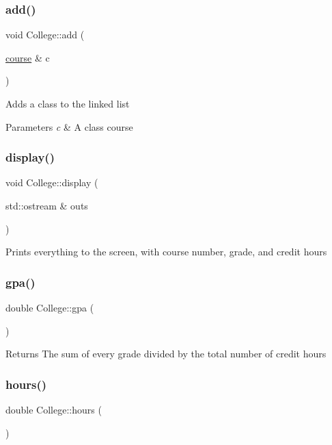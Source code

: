 \subsubsection{\texorpdfstring{add()}{add()}}
{\footnotesize\ttfamily void College\+::add (\begin{DoxyParamCaption}\item[{\hyperlink{classcourse}{course} \&}]{c }\end{DoxyParamCaption})}

Adds a class to the linked list 
\begin{DoxyParams}{Parameters}
{\em c} & A class course \\
\hline
\end{DoxyParams}
\mbox{\label{class_college_a52ca0a164483cf5c05591cd0fb8b300c}} 
\subsubsection{\texorpdfstring{display()}{display()}}
{\footnotesize\ttfamily void College\+::display (\begin{DoxyParamCaption}\item[{std\+::ostream \&}]{outs }\end{DoxyParamCaption})}

Prints everything to the screen, with course number, grade, and credit hours \mbox{\label{class_college_aaf9bfaa0bc717e96da6365661a96fcd0}} 
\subsubsection{\texorpdfstring{gpa()}{gpa()}}
{\footnotesize\ttfamily double College\+::gpa (\begin{DoxyParamCaption}{ }\end{DoxyParamCaption})}

\begin{DoxyReturn}{Returns}
The sum of every grade divided by the total number of credit hours 
\end{DoxyReturn}
\mbox{\label{class_college_a8a7a762611a1d7e00c453390d49355fd}} 
\subsubsection{\texorpdfstring{hours()}{hours()}}
{\footnotesize\ttfamily double College\+::hours (\begin{DoxyParamCaption}{ }\end{DoxyParamCaption})}

